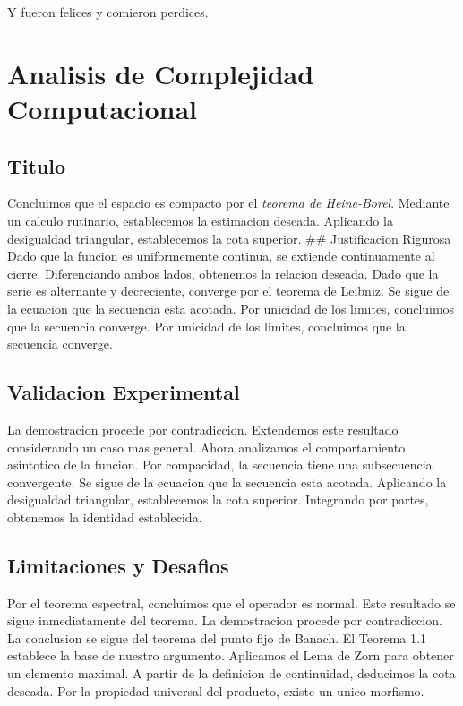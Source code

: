 \documentclass[
]{article}
\begin{document}
Y fueron felices y comieron perdices.

\section{Analisis de Complejidad
Computacional}\label{analisis-de-complejidad-computacional}

\subsection{Titulo}\label{titulo}

Concluimos que el espacio es compacto por el \emph{teorema de
Heine-Borel}. Mediante un calculo rutinario, establecemos la estimacion
deseada. Aplicando la desigualdad triangular, establecemos la cota
superior. \#\# Justificacion Rigurosa Dado que la funcion es
uniformemente continua, se extiende continuamente al cierre.
Diferenciando ambos lados, obtenemos la relacion deseada. Dado que la
serie es alternante y decreciente, converge por el teorema de Leibniz.
Se sigue de la ecuacion que la secuencia esta acotada. Por unicidad de
los limites, concluimos que la secuencia converge. Por unicidad de los
limites, concluimos que la secuencia converge.

\subsection{Validacion Experimental}\label{validacion-experimental}

La demostracion procede por contradiccion. Extendemos este resultado
considerando un caso mas general. Ahora analizamos el comportamiento
asintotico de la funcion. Por compacidad, la secuencia tiene una
subsecuencia convergente. Se sigue de la ecuacion que la secuencia esta
acotada. Aplicando la desigualdad triangular, establecemos la cota
superior. Integrando por partes, obtenemos la identidad establecida.

\subsection{Limitaciones y Desafios}\label{limitaciones-y-desafios}

Por el teorema espectral, concluimos que el operador es normal. Este
resultado se sigue inmediatamente del teorema. La demostracion procede
por contradiccion. La conclusion se sigue del teorema del punto fijo de
Banach. El Teorema 1.1 establece la base de nuestro argumento. Aplicamos
el Lema de Zorn para obtener un elemento maximal. A partir de la
definicion de continuidad, deducimos la cota deseada. Por la propiedad
universal del producto, existe un unico morfismo.
\end{document}
